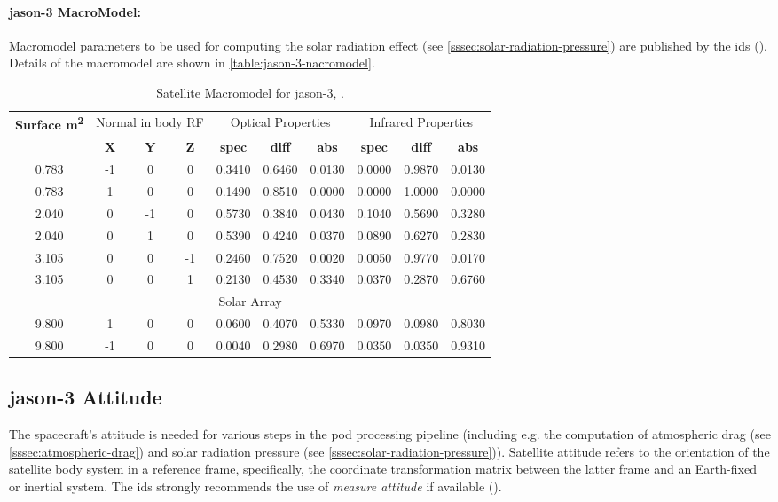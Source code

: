 \paragraph{\gls{jason}-3 MacroModel:}
Macromodel parameters to be used for computing 
the solar radiation effect (see \autoref{sssec:solar-radiation-pressure}) are 
published by the \gls{ids} (\cite{Cerri2022}). Details of the macromodel are 
shown in \autoref{table:jason-3-nacromodel}.
\begin{table}[h!]
  \centering
  \begin{tabular}{cccccccccc}
    \toprule
    \textbf{Surface \si{\meter\tothe{2}}} & 
        \multicolumn{3}{c}{Normal in body RF} &
        \multicolumn{3}{c}{Optical Properties} &
        \multicolumn{3}{c}{Infrared Properties} \\
     & \textbf{X}  & \textbf{Y}    & \textbf{Z} &
     \textbf{spec} & \textbf{diff} & \textbf{abs} &
     \textbf{spec} & \textbf{diff} & \textbf{abs} \\
    \hline
    0.783& -1&  0&  0& 0.3410& 0.6460& 0.0130& 0.0000& 0.9870& 0.0130 \\
    0.783&  1&  0&  0& 0.1490& 0.8510& 0.0000& 0.0000& 1.0000& 0.0000 \\
    2.040&  0& -1&  0& 0.5730& 0.3840& 0.0430& 0.1040& 0.5690& 0.3280 \\
    2.040&  0&  1&  0& 0.5390& 0.4240& 0.0370& 0.0890& 0.6270& 0.2830 \\
    3.105&  0&  0& -1& 0.2460& 0.7520& 0.0020& 0.0050& 0.9770& 0.0170 \\
    3.105&  0&  0&  1& 0.2130& 0.4530& 0.3340& 0.0370& 0.2870& 0.6760 \\
    \multicolumn{10}{c}{Solar Array} \\
    9.800&  1& 0& 0& 0.0600& 0.4070& 0.5330& 0.0970& 0.0980& 0.8030 \\
    9.800& -1& 0& 0& 0.0040& 0.2980& 0.6970& 0.0350& 0.0350& 0.9310 \\
   \bottomrule
  \end{tabular}
  \caption{Satellite Macromodel for \gls{jason}-3, \cite{Cerri2022}.}
  \label{table:jason-3-nacromodel}
\end{table}

\subsection{\gls{jason}-3 Attitude}\label{ssec:jason3-attitude}
The spacecraft's attitude is needed for various steps in the \gls{pod} processing 
pipeline (including e.g. the computation of atmospheric drag (see 
\autoref{sssec:atmospheric-drag}) and solar radiation pressure (see 
\autoref{sssec:solar-radiation-pressure})). Satellite attitude refers to the 
orientation of the satellite body system in a reference frame, specifically, the 
coordinate transformation matrix between the latter frame and an Earth-fixed 
or inertial system. The \gls{ids} strongly recommends the use of \emph{measure attitude} 
if available (\cite{IdsRecommendationItrf2020}). 

